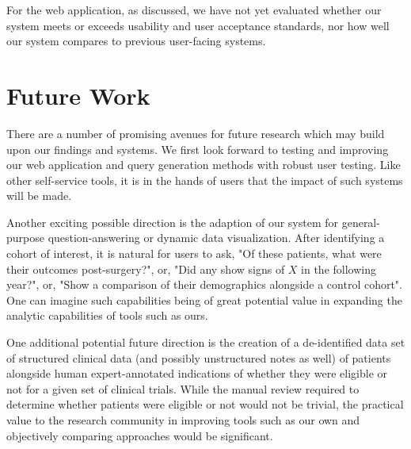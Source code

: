 \documentclass[../main.tex]{subfiles}
\begin{document}
For the web application, as discussed, we have not yet evaluated whether our system meets or exceeds usability and user acceptance standards, nor how well our system compares to previous user-facing systems. 

\section{Future Work}

There are a number of promising avenues for future research which may build upon our findings and systems. We first look forward to testing and improving our web application and query generation methods with robust user testing. Like other self-service tools, it is in the hands of users that the impact of such systems will be made.

Another exciting possible direction is the adaption of our system for general-purpose question-answering or dynamic data visualization. After identifying a cohort of interest, it is natural for users to ask, "Of these patients, what were their outcomes post-surgery?", or, "Did any show signs of $X$ in the following year?", or, "Show a comparison of their demographics alongside a control cohort". One can imagine such capabilities being of great potential value in expanding the analytic capabilities of tools such as ours.

One additional potential future direction is the creation of a de-identified data set of structured clinical data (and possibly unstructured notes as well) of patients alongside human expert-annotated indications of whether they were eligible or not for a given set of clinical trials. While the manual review required to determine whether patients were eligible or not would not be trivial, the practical value to the research community in improving tools such as our own and objectively comparing approaches would be significant.
\end{document}

